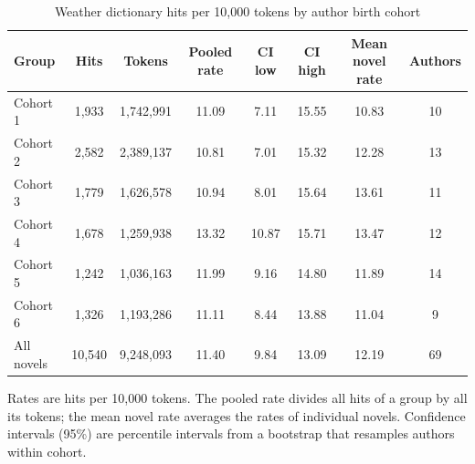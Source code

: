 \begin{table}[t]
\centering
\begin{threeparttable}
\caption{Weather dictionary hits per 10,000 tokens by author birth cohort}
\label{tab:weather_all}
\begin{tabular}{lccccccc}
\toprule
Group & Hits & Tokens & Pooled rate & CI low & CI high & Mean novel rate & Authors \\
\midrule
Cohort 1 & 1,933 & 1,742,991 & 11.09 & 7.11 & 15.55 & 10.83 & 10 \\
Cohort 2 & 2,582 & 2,389,137 & 10.81 & 7.01 & 15.32 & 12.28 & 13 \\
Cohort 3 & 1,779 & 1,626,578 & 10.94 & 8.01 & 15.64 & 13.61 & 11 \\
Cohort 4 & 1,678 & 1,259,938 & 13.32 & 10.87 & 15.71 & 13.47 & 12 \\
Cohort 5 & 1,242 & 1,036,163 & 11.99 & 9.16 & 14.80 & 11.89 & 14 \\
Cohort 6 & 1,326 & 1,193,286 & 11.11 & 8.44 & 13.88 & 11.04 & 9 \\
All novels & 10,540 & 9,248,093 & 11.40 & 9.84 & 13.09 & 12.19 & 69 \\
\bottomrule
\end{tabular}
\begin{tablenotes}[flushleft]
\footnotesize
\item Rates are hits per 10,000 tokens. The pooled rate divides all hits of a group by all its tokens; the mean novel rate averages the rates of individual novels. Confidence intervals (95\%) are percentile intervals from a bootstrap that resamples authors within cohort.
\end{tablenotes}
\end{threeparttable}
\end{table}
